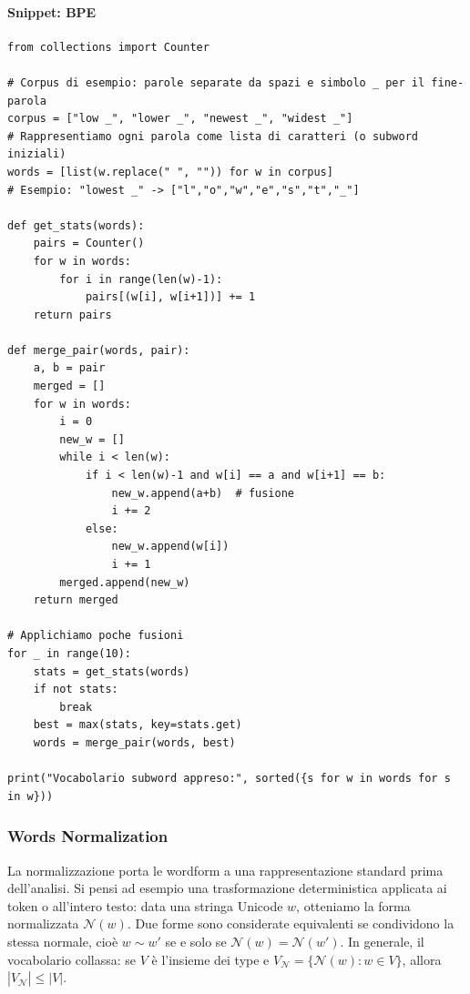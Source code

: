             \paragraph{Snippet: BPE}
            \begin{verbatim}
from collections import Counter

# Corpus di esempio: parole separate da spazi e simbolo _ per il fine-parola
corpus = ["low _", "lower _", "newest _", "widest _"]
# Rappresentiamo ogni parola come lista di caratteri (o subword iniziali)
words = [list(w.replace(" ", "")) for w in corpus]
# Esempio: "lowest _" -> ["l","o","w","e","s","t","_"]

def get_stats(words):
    pairs = Counter()
    for w in words:
        for i in range(len(w)-1):
            pairs[(w[i], w[i+1])] += 1
    return pairs

def merge_pair(words, pair):
    a, b = pair
    merged = []
    for w in words:
        i = 0
        new_w = []
        while i < len(w):
            if i < len(w)-1 and w[i] == a and w[i+1] == b:
                new_w.append(a+b)  # fusione
                i += 2
            else:
                new_w.append(w[i])
                i += 1
        merged.append(new_w)
    return merged

# Applichiamo poche fusioni
for _ in range(10):
    stats = get_stats(words)
    if not stats:
        break
    best = max(stats, key=stats.get)
    words = merge_pair(words, best)

print("Vocabolario subword appreso:", sorted({s for w in words for s in w}))
            \end{verbatim}
        
        \subsubsection{Words Normalization}
        
            La normalizzazione porta le wordform a una rappresentazione standard prima dell'analisi. Si pensi ad esempio una trasformazione deterministica applicata ai token o all'intero testo: data una stringa Unicode $w$, otteniamo la forma normalizzata $\mathcal{N}(w)$. Due forme sono considerate equivalenti se condividono la stessa normale, cio\`e $w \sim w'$ se e solo se $\mathcal{N}(w)=\mathcal{N}(w')$. In generale, il vocabolario collassa: se $V$ \`e l'insieme dei type e $V_{\mathcal{N}}=\{\mathcal{N}(w): w\in V\}$, allora $|V_{\mathcal{N}}| \le |V|$.\\
            
